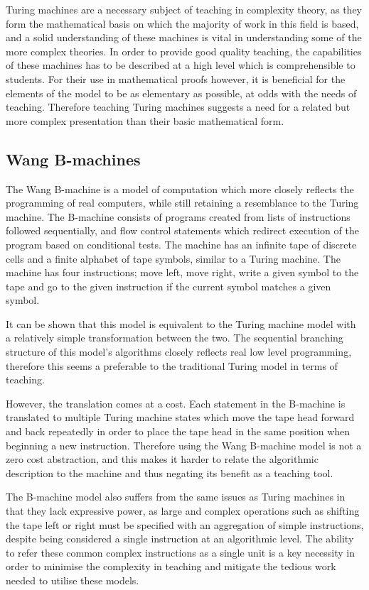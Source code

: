 \documentclass[11pt]{article}
\begin{document}
Turing machines are a necessary subject of teaching in complexity theory, as they form the mathematical basis on which the majority of work in this field is based, and a solid understanding of these machines is vital in understanding some of the more complex theories. In order to provide good quality teaching, the capabilities of these machines has to be described at a high level which is comprehensible to students. For their use in mathematical proofs however, it is beneficial for the elements of the model to be as elementary as possible, at odds with the needs of teaching. Therefore teaching Turing machines suggests a need for a  related but more complex presentation than their basic mathematical form.

\subsection{Wang B-machines}

The Wang B-machine\cite{wang} is a model of computation which more closely reflects the programming of real computers, while still retaining a resemblance to the Turing machine. The B-machine consists of programs created from lists of instructions followed sequentially, and flow control statements which redirect execution of the program based on conditional tests. The machine has an infinite tape of discrete cells and a finite alphabet of tape symbols, similar to a Turing machine. The machine has four instructions; move left, move right, write a given symbol to the tape and go to the given instruction if the current symbol matches a given symbol.

It can be shown that this model is equivalent to the Turing machine model with a relatively simple transformation between the two\cite{stanford}. The sequential branching structure of this model's algorithms closely reflects real low level programming, therefore this seems a preferable to the traditional Turing model in terms of teaching.

However, the translation comes at a cost. Each statement in the B-machine is translated to multiple Turing machine states which move the tape head forward and back repeatedly in order to place the tape head in the same position when beginning a new instruction. Therefore using the Wang B-machine model is not a zero cost abstraction, and this makes it harder to relate the algorithmic description to the machine and thus negating its benefit as a teaching tool.

The B-machine model also suffers from the same issues as Turing machines in that they lack expressive power, as large and complex operations such as shifting the tape left or right must be specified with an aggregation of simple instructions, despite being considered a single instruction at an algorithmic level. The ability to refer these common complex instructions as a single unit is a key necessity in order to minimise the complexity in teaching and mitigate the tedious work needed to utilise these models.
\end{document}
